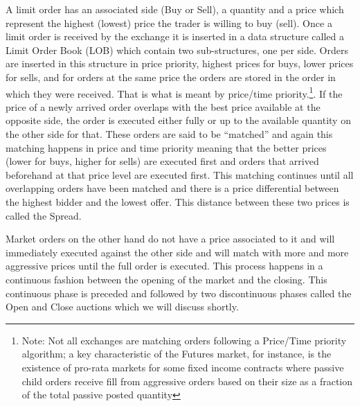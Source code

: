 A limit order has an associated side (Buy or Sell), a quantity and a price which represent the highest (lowest) price the trader is willing to buy (sell). Once a limit order is received by the exchange it is inserted in a data structure called a Limit Order Book (LOB) which contain two sub-structures, one per side. Orders are inserted in this structure in price priority, highest prices for buys, lower prices for sells, and for orders at the same price the orders are stored in the order in which they were received. That is what is meant by price/time priority.\footnote{Note: Not all exchanges are matching orders following a Price/Time priority algorithm; a key characteristic of the Futures market, for instance, is the existence of pro-rata markets for some fixed income contracts where passive child orders receive fill from aggressive orders based on their size as a fraction of the total passive posted quantity}. If the price of a newly arrived order overlaps with the best price available at the opposite side, the order is executed either fully or up to the available quantity on the other side for that. These orders are said to be ``matched'' and again this matching happens in price and time priority meaning that the better prices (lower for buys, higher for sells) are executed first and orders that arrived beforehand at that price level are executed first.  This matching continues until all overlapping orders have been matched and there is a price differential between the highest bidder and the lowest offer. This distance between these two prices is called the Spread.

Market orders on the other hand do not have a price associated to it and will immediately executed against the other side and will match with more and more aggressive prices until the full order is executed. This process happens in a continuous fashion between the opening of the market and the closing. This continuous phase is preceded and followed by two discontinuous phases called the Open and Close auctions which we will discuss shortly. \\





